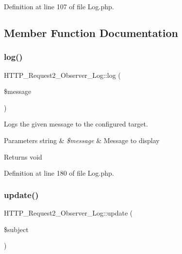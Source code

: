 Definition at line 107 of file Log.\+php.



\subsection{Member Function Documentation}
\hypertarget{classHTTP__Request2__Observer__Log_a253f36793403dd77277fb2e76d19c117}{}\label{classHTTP__Request2__Observer__Log_a253f36793403dd77277fb2e76d19c117} 
\subsubsection{\texorpdfstring{log()}{log()}}
{\footnotesize\ttfamily H\+T\+T\+P\+\_\+\+Request2\+\_\+\+Observer\+\_\+\+Log\+::log (\begin{DoxyParamCaption}\item[{}]{\$message }\end{DoxyParamCaption})\hspace{0.3cm}{\ttfamily [protected]}}

Logs the given message to the configured target.


\begin{DoxyParams}[1]{Parameters}
string & {\em \$message} & Message to display\\
\hline
\end{DoxyParams}
\begin{DoxyReturn}{Returns}
void 
\end{DoxyReturn}


Definition at line 180 of file Log.\+php.

\hypertarget{classHTTP__Request2__Observer__Log_a3afb07b1a609c2f3c12b9cd5fa267947}{}\label{classHTTP__Request2__Observer__Log_a3afb07b1a609c2f3c12b9cd5fa267947} 
\subsubsection{\texorpdfstring{update()}{update()}}
{\footnotesize\ttfamily H\+T\+T\+P\+\_\+\+Request2\+\_\+\+Observer\+\_\+\+Log\+::update (\begin{DoxyParamCaption}\item[{Spl\+Subject}]{\$subject }\end{DoxyParamCaption})}

